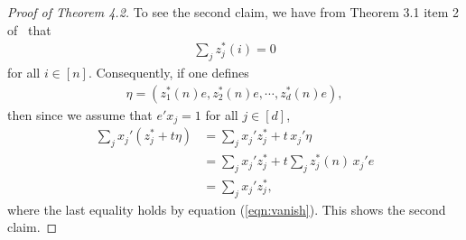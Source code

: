 \begin{proof}[Proof of Theorem 4.2]
To see the second claim, we have from Theorem 3.1 item 2 of~\cite{kline2019properties} that
\begin{align}
\sum_{j} z^*_j(i)=0
\label{eqn:vanish}
\end{align}
for all $i\in[n]$. Consequently, if one defines 
\begin{align*}
\eta=(z_1^{*}(n) e, z^*_2(n)e,\cdots,z^*_{d}(n)e),
\end{align*}
then since we assume that $e'x_j=1$ for all $j\in[d]$,
\begin{align*}
\sum_{j}x_j'(z_j^* + t \eta) &= \sum_{j} x_j'z_j^* + t\,x_j'\eta\\
&= \sum_{j} x_j'z_j^* + t \sum_{j}z_j^{*}(n)\, x_j'e\\
&=  \sum_{j} x_j'z_j^*,
\end{align*}
where the last equality holds by 
equation (\ref{eqn:vanish}). This shows the second claim.
\end{proof}





